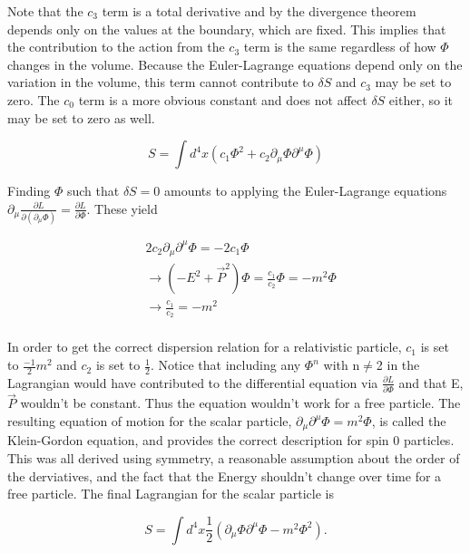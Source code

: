 Note that the $c_3$ term is a total derivative and by the divergence theorem depends only on the values at the boundary, which are fixed. This implies that the contribution to the action from the $c_3$ term is the same regardless of how $\Phi$ changes in the volume. Because the Euler-Lagrange equations depend only on the variation in the volume, this term cannot contribute to $\delta S$ and $c_3$ may be set to zero. The $c_0$ term is a more obvious constant and does not affect $\delta S$ either, so it may be set to zero as well. 

\begin{equation}
S = \int d^4x \left(c_1 \Phi^2 + c_2 \partial_\mu\Phi\partial^\mu\Phi\right)
\end{equation}

Finding $\Phi$ such that $\delta S = 0$ amounts to applying the Euler-Lagrange equations $\partial_\mu \frac{\partial L}{\partial\left(\partial_\mu\Phi\right)} = \frac{\partial L}{\partial \Phi}$. These yield 

\begin{equation}
\begin{split}
&2c_2\partial_\mu\partial^\mu\Phi = -2c_1\Phi \\ 
&\rightarrow (-E^2 + \vec{P}^2)\Phi = \frac{c_1}{c_2}\Phi = -m^2\Phi \\
&\rightarrow \frac{c_1}{c_2} = -m^2 \\
\end{split}
\end{equation}

In order to get the correct dispersion relation for a relativistic particle, $c_1$ is set to $\frac{-1}{2}m^2$ and $c_2$ is set to $\frac{1}{2}$. Notice that including any $\Phi^n$ with n$\neq$2 in the Lagrangian would have contributed to the differential equation via $\frac{\partial L}{\partial \Phi}$ and that E, $\vec{P}$ wouldn't be constant. Thus the equation wouldn't work for a free particle. The resulting equation of motion for the scalar particle, $\partial_\mu\partial^\mu\Phi = m^2\Phi$, is called the Klein-Gordon equation, and provides the correct description for spin 0 particles. This was all derived using symmetry, a reasonable assumption about the order of the derviatives, and the fact that the Energy shouldn't change over time for a free particle. The final Lagrangian for the scalar particle is 

\begin{equation}
S = \int d^4x \frac{1}{2}\left(\partial_\mu\Phi\partial^\mu\Phi - m^2 \Phi^2 \right).
\end{equation}

